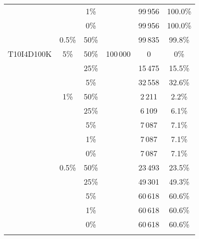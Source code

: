 {\begin{longtable}{cccccc}
				  &     &  1\% &           & 99\,956 & 100.0\% \\
				  &     &  0\% &           & 99\,956 & 100.0\% \\
				      & 0.5\% &  50\% &        & 99\,835 & 99.8\% \\          %
   \hline
  T10I4D100K & 5\%   & 50\%  & 100\,000  & 0       & 0\%    \\
	           &       & 25\%  &           & 15\,475 & 15.5\% \\
             &       & 5\%   &           & 32\,558 & 32.6\% \\
             & 1\%   & 50\%  &           &  2\,211 &  2.2\% \\
			       &       & 25\%  &           &  6\,109 &  6.1\% \\
				     &       &  5\%  &           &  7\,087 &  7.1\% \\
				     &       &  1\%  &           &  7\,087 &  7.1\% \\
				     &       &  0\%  &           &  7\,087 &  7.1\% \\
				     & 0.5\% &  50\% &           & 23\,493 & 23.5\% \\
				     &       & 25\%  &           & 49\,301 & 49.3\% \\       %
				     &       &  5\%  &           & 60\,618 & 60.6\% \\
				     &       &  1\%  &           & 60\,618 & 60.6\% \\
				     &       &  0\%  &           & 60\,618 & 60.6\% \\
\label{tab:2-2-2-DvsR}
\end{longtable}
}


